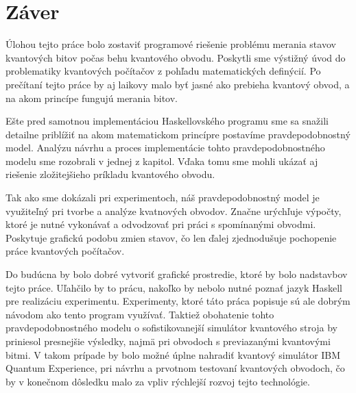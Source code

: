
\chapter{Záver}
Úlohou tejto práce bolo zostaviť programové riešenie problému merania
stavov kvantových bitov počas behu kvantového obvodu. Poskytli sme výstižný
úvod do problematiky kvantových počítačov z pohľadu matematických 
definýcií. Po prečítaní tejto práce by aj laikovy malo byť jasné ako prebieha
kvantový obvod, a na akom princípe fungujú merania bitov.

Ešte pred samotnou implementáciou Haskellovského programu sme sa snažili 
detailne priblížiť na akom matematickom princípre postavíme pravdepodobnostný
model. Analýzu návrhu a proces implementácie tohto pravdepodobnostného modelu
sme rozobrali v jednej z kapitol. Vďaka tomu sme mohli ukázať aj riešenie 
zložitejšieho príkladu kvantového obvodu.

Tak ako sme dokázali pri experimentoch, náš pravdepodobnostný model je 
využiteľný pri tvorbe a analýze kvatnových obvodov. Značne urýchľuje výpočty,
ktoré je nutné vykonávať a odvodzovať pri práci s spomínanými obvodmi.
Poskytuje grafickú podobu zmien stavov, čo len ďalej zjednodušuje pochopenie
práce kvantových počítačov.

Do budúcna by bolo dobré vytvoriť grafické prostredie, ktoré by bolo 
nadstavbov tejto práce. Uľahčilo by to prácu, nakoľko by nebolo nutné poznať
jazyk Haskell pre realizáciu experimentu. Experimenty, ktoré táto práca 
popisuje sú ale dobrým návodom ako tento program využívať. Taktiež obohatenie 
tohto pravdepodobnostného modelu o sofistikovanejší simulátor kvantového stroja
by priniesol presnejšie výsledky, najmä pri obvodoch s previazanými kvantovými
bitmi. V takom prípade by bolo možné úplne nahradiť kvantový simulátor
IBM Quantum Experience, pri návrhu a prvotnom testovaní kvantových obvodoch,
čo by v konečnom dôsledku malo za vpliv rýchlejší rozvoj tejto technológie.
